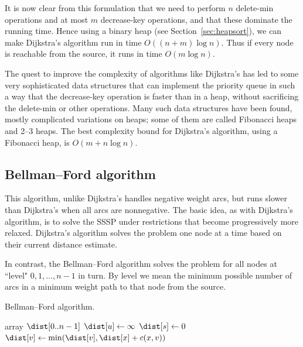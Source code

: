 It is now clear from this formulation that we need to perform $n$
delete-min operations and at most $m$ decrease-key operations, and
that these dominate the running time. Hence using a binary heap (see
Section~\ref{sec:heapsort}), we can make Dijkstra's
algorithm run in time $O((n + m) \log n)$. Thus if every node is reachable 
from the source, it runs in time $O(m\log n)$.

The quest to improve the complexity of algorithms like Dijkstra's has
led to some very sophisticated data structures that can implement the
priority queue in such a way that the decrease-key operation is faster
than in a heap, without sacrificing the delete-min or other operations.
Many such data structures have been found, mostly complicated variations
on heaps; some of them are called Fibonacci heaps and 2--3 heaps. The
best complexity bound for Dijkstra's algorithm, using a Fibonacci heap,
is $O(m + n\log n)$.

\subsection{Bellman--Ford algorithm}
\label{subsec:bellford}

This algorithm, unlike Dijkstra's handles negative weight arcs, but runs
slower than Dijkstra's when all arcs are nonnegative. The basic idea,
as with Dijkstra's algorithm, is to solve the SSSP under  restrictions
that become progressively more relaxed. Dijkstra's algorithm solves the
problem one node at a time based on their current distance estimate.

In contrast, the Bellman--Ford algorithm solves the problem for all
nodes at ``level" $0, 1, \dots , n-1$ in turn. By level we mean the
minimum possible number of arcs in a minimum weight path to that node from the
source.

\begin{algorithm}[H]
  \caption{Bellman--Ford algorithm.}
  \label{alg:bellford-code}
\begin{algorithmic}[1]
	\State array $\dist[0..n-1]$
		\State $\dist[u] \gets \infty$ 
	\EndFor
	\State $\dist[s] \gets 0$
				\State $\dist[v] \gets \min( \dist[v], \dist[x] + c(x,v) )$
			\EndFor
		\EndFor
	\EndFor
	\State \Return{$\dist$}
\EndFunction
\end{algorithmic}
\end{algorithm}


